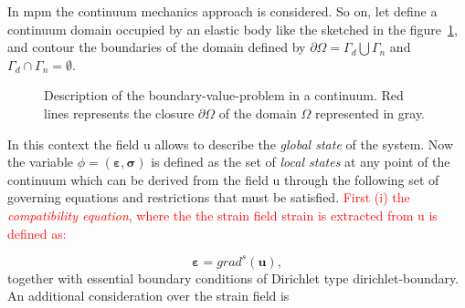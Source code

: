 \documentclass[preprint,12pt,a4paper]{elsarticle}
\newcommand{\vect}[1]{
  \ensuremath{\mathbf{{#1}}}
}
\newcommand{\tens}[1]{
  \ensuremath{\mathbf{{#1}}}
}
\newcommand{\red}[1]{
  \textcolor{red}{{#1}}
}
\newcommand\GradS[1]{grad^s({#1})}
\begin{document}
In \acrshort{mpm} the continuum mechanics approach is considered. So on, let
define a continuum \gls{domain}  occupied by an elastic body like
the sketched in the figure~\ref{fig:Continuum-solid}, and \gls{contour} the boundaries of the domain defined by $\partial \varOmega
= \Gamma_d \bigcup \Gamma_n$ and $\Gamma_d \cap  \Gamma_n = \emptyset$.
\begin{figure}\sidecaption
  \centering
  \caption{Description of the boundary-value-problem in a
    continuum. Red lines represents the closure $\partial \varOmega$
    of the domain $\varOmega$ represented in gray.}
  \label{fig:Continuum-solid}
\end{figure}
In this context the field \gls{u} allows to describe the \textit{global state}
of the system. Now the variable $\phi =
(\tens{\varepsilon},\tens{\sigma})$ is defined as the set of \textit{local
  states} at any point of the continuum which can be derived from the
field \gls{u} through the following set of governing equations and
restrictions that must be satisfied. \red{First (i) the \textit{compatibility
  equation}, where the the strain field \gls{strain} is extracted from \gls{u} is defined as:}
\begin{equation}
  \label{eq:Compatibility-equation}
  \tens{\varepsilon} = \GradS{\vect{u}},
\end{equation}
together with essential boundary conditions of Dirichlet type \gls{dirichlet-boundary}. An additional consideration over the strain field is
\end{document}
